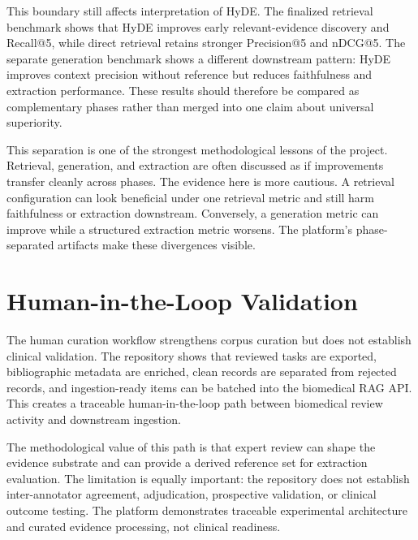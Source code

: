 This boundary still affects interpretation of HyDE. The finalized retrieval benchmark shows that HyDE improves early relevant-evidence discovery and Recall@5, while direct retrieval retains stronger Precision@5 and nDCG@5. The separate generation benchmark shows a different downstream pattern: HyDE improves context precision without reference but reduces faithfulness and extraction performance. These results should therefore be compared as complementary phases rather than merged into one claim about universal superiority.

This separation is one of the strongest methodological lessons of the project. Retrieval, generation, and extraction are often discussed as if improvements transfer cleanly across phases. The evidence here is more cautious. A retrieval configuration can look beneficial under one retrieval metric and still harm faithfulness or extraction downstream. Conversely, a generation metric can improve while a structured extraction metric worsens. The platform's phase-separated artifacts make these divergences visible.

\section{Human-in-the-Loop Validation}

The human curation workflow strengthens corpus curation but does not establish clinical validation. The repository shows that reviewed tasks are exported, bibliographic metadata are enriched, clean records are separated from rejected records, and ingestion-ready items can be batched into the biomedical RAG API. This creates a traceable human-in-the-loop path between biomedical review activity and downstream ingestion.

The methodological value of this path is that expert review can shape the evidence substrate and can provide a derived reference set for extraction evaluation. The limitation is equally important: the repository does not establish inter-annotator agreement, adjudication, prospective validation, or clinical outcome testing. The platform demonstrates traceable experimental architecture and curated evidence processing, not clinical readiness.

